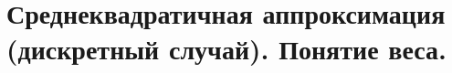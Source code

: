 \documentclass[../../calc-math-exam-2023.tex]{subfiles}
\begin{document}
    \section{Среднеквадратичная аппроксимация (дискретный случай). Понятие веса.}\label{sec:ch13}
\end{document}
